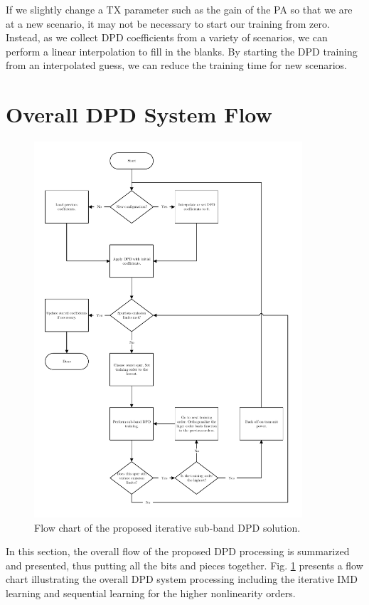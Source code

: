 If we slightly change a TX parameter such as the gain of the PA so that we are at a new scenario, it may not be necessary to start our training from zero. Instead, as we collect DPD coefficients from a variety of scenarios, we can perform a linear interpolation to fill in the blanks. By starting the DPD training from an interpolated guess, we can reduce the training time for new scenarios.



\section{Overall DPD System Flow}
\label{sec:SystemFlow}
\begin{figure}
	\centering
	\centerline{\includegraphics[width=0.89\textwidth]{SubBandSystemNew.pdf}}
	\caption[]{Flow chart of the proposed iterative sub-band DPD solution.}
	\label{fig:SystemFlowChart}
\end{figure}
In this section, the overall flow of the proposed DPD processing is summarized and presented, thus putting all the bits and pieces together. 
Fig. \ref{fig:SystemFlowChart} presents a flow chart illustrating the overall DPD system processing including the iterative IMD learning and sequential learning for the higher nonlinearity orders.

